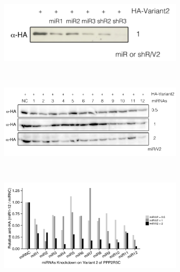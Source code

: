 \begin{figure}[htbp]
\centering

	\begin{subfigure}[t]{0.375\textwidth}
	\includegraphics[width=1\textwidth]{figs/fig2-6a1.pdf}
    \label{fig:fig2.6a}
	\end{subfigure}%
\\
	\begin{subfigure}[t]{0.625\textwidth}
	\includegraphics[width=1\textwidth]{figs/fig2-6a2.pdf}
    \label{fig:fig2.6b}
	\end{subfigure}%
\\
	\begin{subfigure}[t]{1\textwidth}
	\includegraphics[width=1\textwidth]{figs/fig2-6b miR kd v2.pdf}

\end{subfigure}
\end{figure}
